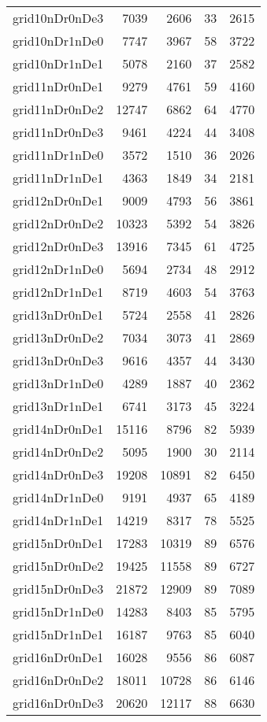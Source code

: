\begin{longtable}{lrrrr}
grid10nDr0nDe3 & 7039 & 2606 & 33 & 2615 \\
grid10nDr1nDe0 & 7747 & 3967 & 58 & 3722 \\
grid10nDr1nDe1 & 5078 & 2160 & 37 & 2582 \\
grid11nDr0nDe1 & 9279 & 4761 & 59 & 4160 \\
grid11nDr0nDe2 & 12747 & 6862 & 64 & 4770 \\
grid11nDr0nDe3 & 9461 & 4224 & 44 & 3408 \\
grid11nDr1nDe0 & 3572 & 1510 & 36 & 2026 \\
grid11nDr1nDe1 & 4363 & 1849 & 34 & 2181 \\
grid12nDr0nDe1 & 9009 & 4793 & 56 & 3861 \\
grid12nDr0nDe2 & 10323 & 5392 & 54 & 3826 \\
grid12nDr0nDe3 & 13916 & 7345 & 61 & 4725 \\
grid12nDr1nDe0 & 5694 & 2734 & 48 & 2912 \\
grid12nDr1nDe1 & 8719 & 4603 & 54 & 3763 \\
grid13nDr0nDe1 & 5724 & 2558 & 41 & 2826 \\
grid13nDr0nDe2 & 7034 & 3073 & 41 & 2869 \\
grid13nDr0nDe3 & 9616 & 4357 & 44 & 3430 \\
grid13nDr1nDe0 & 4289 & 1887 & 40 & 2362 \\
grid13nDr1nDe1 & 6741 & 3173 & 45 & 3224 \\
grid14nDr0nDe1 & 15116 & 8796 & 82 & 5939 \\
grid14nDr0nDe2 & 5095 & 1900 & 30 & 2114 \\
grid14nDr0nDe3 & 19208 & 10891 & 82 & 6450 \\
grid14nDr1nDe0 & 9191 & 4937 & 65 & 4189 \\
grid14nDr1nDe1 & 14219 & 8317 & 78 & 5525 \\
grid15nDr0nDe1 & 17283 & 10319 & 89 & 6576 \\
grid15nDr0nDe2 & 19425 & 11558 & 89 & 6727 \\
grid15nDr0nDe3 & 21872 & 12909 & 89 & 7089 \\
grid15nDr1nDe0 & 14283 & 8403 & 85 & 5795 \\
grid15nDr1nDe1 & 16187 & 9763 & 85 & 6040 \\
grid16nDr0nDe1 & 16028 & 9556 & 86 & 6087 \\
grid16nDr0nDe2 & 18011 & 10728 & 86 & 6146 \\
grid16nDr0nDe3 & 20620 & 12117 & 88 & 6630 \\

\end{longtable}
